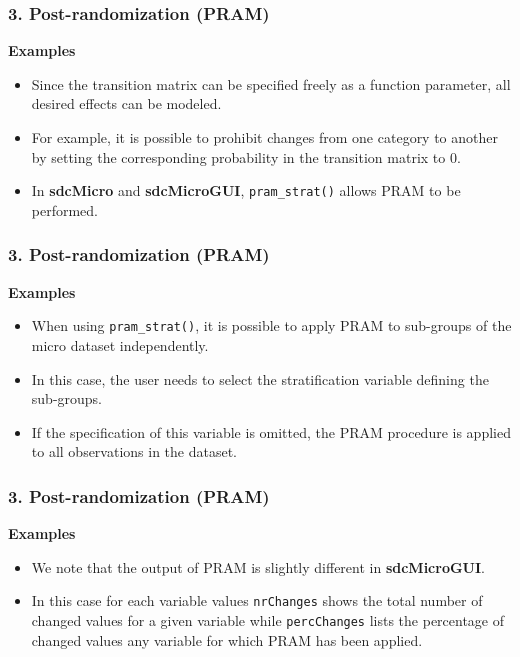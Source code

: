 \documentclass{beamer}
\begin{document}
\begin{frame}
	\frametitle{3. Post-randomization (PRAM)}
	\textbf{Examples}\\
	\begin{itemize}
\item Since the transition matrix can be specified freely as a
function parameter, all desired effects can be modeled. 
\item For example, it is possible
to prohibit changes from one category to another by setting the corresponding
probability in the transition matrix to 0.

\item In \textbf{sdcMicro} and \textbf{sdcMicroGUI}, \texttt{pram\_strat()} allows PRAM to be performed.
\end{itemize}
\end{frame}
\begin{frame}
	\frametitle{3. Post-randomization (PRAM)}
	\textbf{Examples}
	\begin{itemize}
\item When using \texttt{pram\_strat()}, it is possible
to apply PRAM to sub-groups of the micro dataset independently. \item In this case,
the user needs to select the stratification variable deﬁning the sub-groups. \item If
the speciﬁcation of this variable is omitted, the PRAM procedure is applied to
all observations in the dataset.
\end{itemize}
\end{frame}
\begin{frame}
	\frametitle{3. Post-randomization (PRAM)}
	\textbf{Examples}
	\begin{itemize} \item  We note that the output of PRAM is slightly
different in \textbf{sdcMicroGUI}. 
\item In this case for each variable values \texttt{nrChanges} shows
the total number of changed values for a given variable while \texttt{percChanges} lists the
percentage of changed values any variable for which PRAM has been applied.
\end{itemize}
\end{frame}
\end{document}
